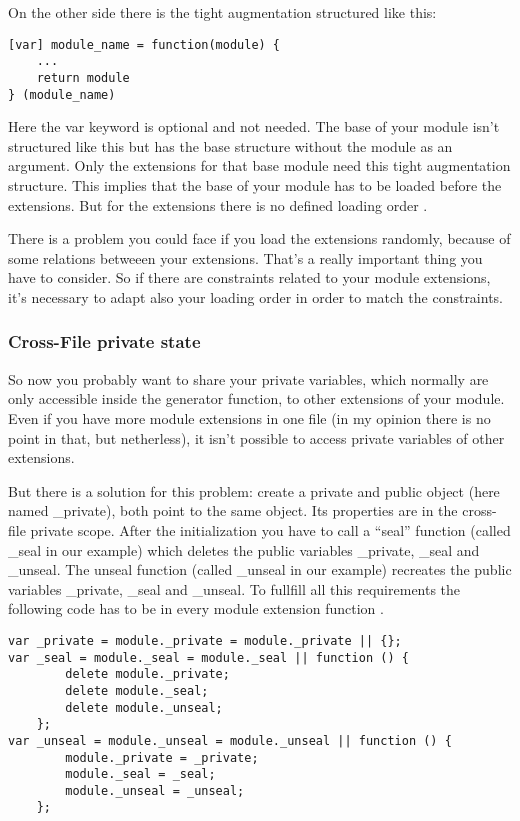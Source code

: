 \documentclass{bioinfo}
\begin{document}
On the other side there is the tight augmentation structured like this:

\begin{lstlisting}
[var] module_name = function(module) {
    ...
    return module
} (module_name)
\end{lstlisting}

Here the var keyword is optional and not needed. The base of your module isn't structured
like this but has the base structure without the module as an argument. Only the extensions for
that base module need this tight augmentation structure. This implies that the base of
your module has to be loaded before the extensions. But for the extensions there is no defined
loading order \cite{adequatelygood}. \vspace{\baselineskip}

There is a problem you could face if you load the extensions randomly, because of some relations
betweeen your extensions. That's a really important thing you have to consider. So if there are
constraints related to your module extensions, it's necessary to adapt also your loading
order in order to match the constraints.

\subsubsection{Cross-File private state}
So now you probably want to share your private variables, which normally are only accessible
inside the generator function, to other extensions of your module. Even if you have
more module extensions in one file (in my opinion there is no point in that, but netherless),
it isn't possible to access private variables of other extensions.

But there is a solution for this problem: create a private and public object (here named \_private), both point
to the same object. Its properties are in the cross-file private scope. After the initialization
you have to call a ``seal'' function (called \_seal in our example) which deletes the public
variables \_private, \_seal and \_unseal. The unseal function (called \_unseal in our example)
recreates the public variables \_private, \_seal and \_unseal. To fullfill all this
requirements the following code has to be in every module extension function \cite{adequatelygood}.

\begin{lstlisting}
var _private = module._private = module._private || {};
var _seal = module._seal = module._seal || function () {
        delete module._private;
        delete module._seal;
        delete module._unseal;
    };
var _unseal = module._unseal = module._unseal || function () {
        module._private = _private;
        module._seal = _seal;
        module._unseal = _unseal;
    };
\end{lstlisting}
\end{document}
